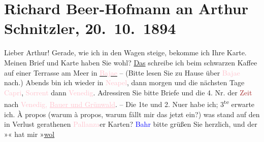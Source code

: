 

               \section[Richard Beer-Hofmann an Arthur Schnitzler, 20. 10. 1894]{ Richard Beer-Hofmann an Arthur Schnitzler, 20. 10. 1894}\nopagebreak{}\rehead{ }\normalsize\beginnumbering{} \toendnotes[C]{\smallbreak\pagebreak[2]} 
\toendnotes[C]{\smallbreak}\pstart
           \noindent{}{\pb}Lieber Arthur!
                    Gerade, wie ich in den Wagen steige, bekomme ich Ihre Karte. Meinen
                    Brief  und Karte haben Sie wohl?\pend
           \pstart
           \uline{Das}
               schreibe ich beim schwarzen Kaffee auf einer
                    Terrasse am Meer in \uline{\textcolor{pink}{Bajae}{}\ledrightnote{\textcolor{pink}{Baia}}} – (Bitte lesen Sie zu Hause über \textcolor{pink}{Bajae}{}\ledrightnote{\textcolor{pink}{Baia}}
                    nach.) Abends bin ich wieder in \textcolor{pink}{Neapel}{}\ledrightnote{\textcolor{pink}{Neapel}}, dann
                    morgen und die nächsten Tage \textcolor{pink}{Capri}{}\ledrightnote{\textcolor{pink}{Capri}},
                        \textcolor{pink}{Sorrent}{}\ledrightnote{\textcolor{pink}{Sorrent}} dann \textcolor{pink}{Venedig}{}\ledrightnote{\textcolor{pink}{Venedig}}. Adressiren Sie bitte Briefe und die 4. Nr. der
                        \textcolor{brown}{Zeit}{}\ledrightnote{\textcolor{brown}{Die Zeit. Wiener Wochenschrift}} nach \textcolor{pink}{Venedig,
                            \uline{Bauer und Grünwald}}{}\ledrightnote{\textcolor{pink}{Grand Hotel Bauer-Grünwald}}. – Die 1te und 2. Nu{\geminationm}er habe ich; 3\textsuperscript{te} erwarte ich. {\pb}À propos (warum à propos,
                    warum fällt mir das jetzt ein?) was stand auf den in Verlust gerathenen
                        \textcolor{pink}{Pallanza}{}\ledrightnote{\textcolor{pink}{Pallanza}}er Karten? \textcolor{blue}{Bahr}{}\ledrightnote{\textcolor{blue}{Hermann Bahr}} bitte grüßen Sie herzlich, und der »\label{K_L00388_1v}\label{K_L00388_1h}« hat mir »\uline{wol}
